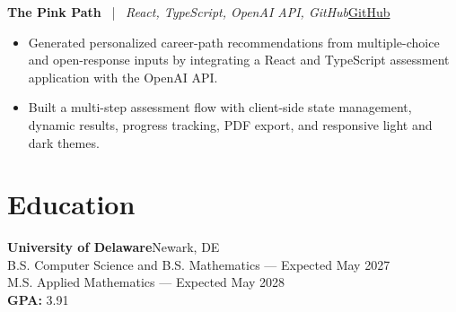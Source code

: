 \documentclass[10.5pt]{article}
\newcommand{\entryline}[2]{%
\vspace{1pt}\textbf{#1}\hfill#2\\
}
\newcommand{\projline}[3]{%
\vspace{1pt}\textbf{#1} \ | \ \textit{#2}\hfill\href{#3}{GitHub}\\
}
\begin{document}
\projline{The Pink Path}{React, TypeScript, OpenAI API, GitHub}{https://github.com/emmajudd/CISC275-finalproject}
\begin{itemize}
\item Generated personalized career-path recommendations from multiple-choice and open-response inputs by integrating a React and TypeScript assessment application with the OpenAI API.
\item Built a multi-step assessment flow with client-side state management, dynamic results, progress tracking, PDF export, and responsive light and dark themes.
\end{itemize}

\section*{Education}
\entryline{University of Delaware}{Newark, DE}
B.S. Computer Science and B.S. Mathematics --- Expected May 2027\\
M.S. Applied Mathematics --- Expected May 2028\\
\textbf{GPA:} 3.91
\end{document}
